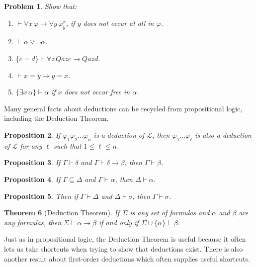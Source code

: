 \documentclass[12pt]{amsbook}
\newcommand{\proves}{\vdash}
\theoremstyle{plain}
\newtheorem{thm}{Theorem}[chapter]
\newtheorem{prop}[thm]{Proposition}
\newtheorem{prob}[thm]{Problem}
\theoremstyle{definition}
\theoremstyle{remark}
\begin{document}
\begin{prob} \label{p:deds}
Show that:
\begin{enumerate}
\item $\proves \forall x\, \varphi \to \forall y\, \varphi^x_y$,  if $y$ does not occur at all in $\varphi$.
\item $\proves \alpha \lor \lnot \alpha$.
\item $\{ c = d \} \proves \forall z\, Qazc \to Qazd$.
\item $\proves x = y \to y = x$.
\item $\{ \exists x\, \alpha \} \proves \alpha$ if $x$ does not occur free in $\alpha$.
\end{enumerate}
\end{prob}

Many general facts about deductions can be recycled from propositional logic,  including the Deduction Theorem.

\begin{prop} \label{p:seven5a}
If $\varphi_1 \varphi_2 \dots \varphi_n$ is a deduction of $\mathcal{L}$,  then $\varphi_1  \dots \varphi_\ell$ is also a deduction of $\mathcal{L}$ for any $\ell$ such that $1 \le \ell \le n$.
\end{prop}

\begin{prop} \label{p:seven6}
If $\Gamma \proves \delta$ and $\Gamma \proves \delta \to \beta$,  then $\Gamma \proves \beta$.
\end{prop}

\begin{prop} \label{p:bim}
If $\Gamma \subseteq \Delta$ and $\Gamma \proves \alpha$,  then $\Delta \proves \alpha$.
\end{prop}

\begin{prop} \label{p:seven8}
Then if $\Gamma \proves \Delta$ and $\Delta \proves \sigma$,  then $\Gamma \proves \sigma$.
\end{prop}

\begin{thm}[Deduction Theorem] \label{t:fded} 
If $\Sigma$ is any set of formulas and $\alpha$ and $\beta$ are any formulas,  then $\Sigma \proves \alpha \to \beta$ if and only if $\Sigma \cup \{ \alpha \} \proves \beta$.
\end{thm}

Just as in propositional logic,  the Deduction Theorem is useful because it often lets us take shortcuts when trying to show that deductions exist.  There is also another result about first-order deductions which often supplies useful shortcuts.
\end{document}
